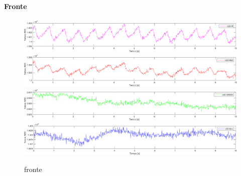 \paragraph{Fronte}
\begin{figure}[h]
	\centering
	\includegraphics[width=1\linewidth]{ImageFiles/Misure Preliminari/Soggetto 1/fronte_ired}
	\includegraphics[width=1\linewidth]{ImageFiles/Misure Preliminari/Soggetto 1/fronte_red}
	\includegraphics[width=1\linewidth]{ImageFiles/Misure Preliminari/Soggetto 1/fronte_green}
	\includegraphics[width=1\linewidth]{ImageFiles/Misure Preliminari/Soggetto 1/fronte_blu}
	\caption{fronte}
	\label{fig:Descrizione_Segnale_PPG}
\end{figure}






\clearpage